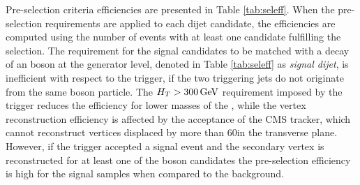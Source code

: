 
Pre-selection criteria efficiencies are presented in Table \ref{tab:seleff}.  
When the pre-selection requirements are applied to each dijet candidate,
the efficiencies are computed using the number of events with at least one candidate fulfilling the selection.
The requirement for the signal candidates to be matched with a decay of an \X boson at the generator level,
 denoted in Table \ref{tab:seleff} as {\it signal dijet}, 
is inefficient with respect to the trigger, if the two triggering
jets do not originate from the same \X boson particle.  
The $H_T>300\,\text{Ge\hspace{-.08em}V}$ requirement imposed by the trigger reduces the efficiency for lower masses of the \Higgs, 
while the vertex reconstruction efficiency is affected by the acceptance of the CMS tracker, which cannot 
reconstruct vertices displaced by more than 60\cm in the transverse plane. However, if the trigger accepted a signal event and the secondary vertex is reconstructed
for at least one of the \X boson candidates the pre-selection efficiency is high for the signal samples
when compared to the background.   

